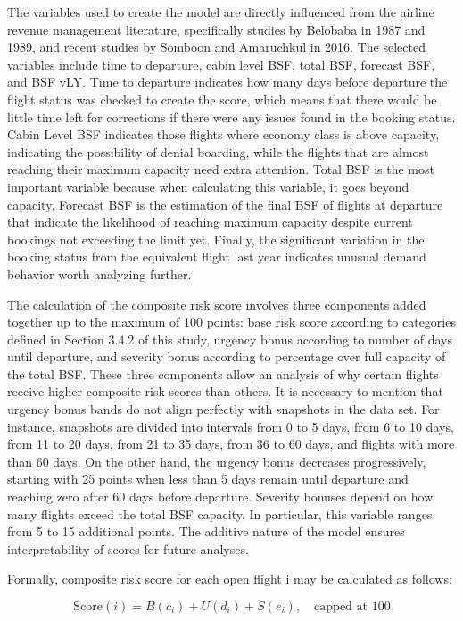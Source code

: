 The variables used to create the model are directly influenced from the airline revenue management literature, specifically studies by Belobaba in 1987 and 1989, and recent studies by Somboon and Amaruchkul in 2016. The selected variables include time to departure, cabin level BSF, total BSF, forecast BSF, and BSF vLY. Time to departure indicates how many days before departure the flight status was checked to create the score, which means that there would be little time left for corrections if there were any issues found in the booking status. Cabin Level BSF indicates those flights where economy class is above capacity, indicating the possibility of denial boarding, while the flights that are almost reaching their maximum capacity need extra attention. Total BSF is the most important variable because when calculating this variable, it goes beyond capacity. Forecast BSF is the estimation of the final BSF of flights at departure that indicate the likelihood of reaching maximum capacity despite current bookings not exceeding the limit yet. Finally, the significant variation in the booking status from the equivalent flight last year indicates unusual demand behavior worth analyzing further.

The calculation of the composite risk score involves three components added together up to the maximum of 100 points: base risk score according to categories defined in Section 3.4.2 of this study, urgency bonus according to number of days until departure, and severity bonus according to percentage over full capacity of the total BSF. These three components allow an analysis of why certain flights receive higher composite risk scores than others. It is necessary to mention that urgency bonus bands do not align perfectly with snapshots in the data set. For instance, snapshots are divided into intervals from 0 to 5 days, from 6 to 10 days, from 11 to 20 days, from 21 to 35 days, from 36 to 60 days, and flights with more than 60 days. On the other hand, the urgency bonus decreases progressively, starting with 25 points when less than 5 days remain until departure and reaching zero after 60 days before departure. Severity bonuses depend on how many flights exceed the total BSF capacity. In particular, this variable ranges from 5 to 15 additional points. The additive nature of the model ensures interpretability of scores for future analyses.

Formally, composite risk score for each open flight i may be calculated as follows:

\[ \mathrm{Score}(i) = B(c_i) + U(d_i) + S(e_i), \quad \text{capped at } 100 \]

